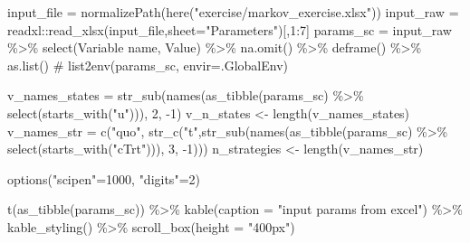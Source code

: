 \documentclass[
  letterpaper,
  DIV=11,
  numbers=noendperiod,
  oneside]{scrartcl}
\newenvironment{Shaded}{\begin{snugshade}}{\end{snugshade}}
\newcommand{\AttributeTok}[1]{\textcolor[rgb]{0.40,0.45,0.13}{#1}}
\newcommand{\CommentTok}[1]{\textcolor[rgb]{0.37,0.37,0.37}{#1}}
\newcommand{\DecValTok}[1]{\textcolor[rgb]{0.68,0.00,0.00}{#1}}
\newcommand{\FunctionTok}[1]{\textcolor[rgb]{0.28,0.35,0.67}{#1}}
\newcommand{\NormalTok}[1]{\textcolor[rgb]{0.00,0.23,0.31}{#1}}
\newcommand{\OtherTok}[1]{\textcolor[rgb]{0.00,0.23,0.31}{#1}}
\newcommand{\SpecialCharTok}[1]{\textcolor[rgb]{0.37,0.37,0.37}{#1}}
\newcommand{\StringTok}[1]{\textcolor[rgb]{0.13,0.47,0.30}{#1}}
\begin{document}
\begin{Shaded}
\begin{Highlighting}[]
\NormalTok{input\_file }\OtherTok{=} \FunctionTok{normalizePath}\NormalTok{(}\FunctionTok{here}\NormalTok{(}\StringTok{"exercise/markov\_exercise.xlsx"}\NormalTok{))}
\NormalTok{input\_raw }\OtherTok{=}\NormalTok{ readxl}\SpecialCharTok{::}\FunctionTok{read\_xlsx}\NormalTok{(input\_file,}\AttributeTok{sheet=}\StringTok{"Parameters"}\NormalTok{)[,}\DecValTok{1}\SpecialCharTok{:}\DecValTok{7}\NormalTok{]}
\NormalTok{params\_sc }\OtherTok{=}\NormalTok{ input\_raw }\SpecialCharTok{\%\textgreater{}\%} 
  \FunctionTok{select}\NormalTok{(}\StringTok{\textasciigrave{}}\AttributeTok{Variable name}\StringTok{\textasciigrave{}}\NormalTok{, Value) }\SpecialCharTok{\%\textgreater{}\%}
  \FunctionTok{na.omit}\NormalTok{() }\SpecialCharTok{\%\textgreater{}\%}
  \FunctionTok{deframe}\NormalTok{() }\SpecialCharTok{\%\textgreater{}\%}
  \FunctionTok{as.list}\NormalTok{()}
\CommentTok{\# list2env(params\_sc, envir=.GlobalEnv)}

\NormalTok{v\_names\_states }\OtherTok{=} \FunctionTok{str\_sub}\NormalTok{(}\FunctionTok{names}\NormalTok{(}\FunctionTok{as\_tibble}\NormalTok{(params\_sc) }\SpecialCharTok{\%\textgreater{}\%} \FunctionTok{select}\NormalTok{(}\FunctionTok{starts\_with}\NormalTok{(}\StringTok{"u"}\NormalTok{))), }\DecValTok{2}\NormalTok{, }\SpecialCharTok{{-}}\DecValTok{1}\NormalTok{)}
\NormalTok{v\_n\_states }\OtherTok{\textless{}{-}} \FunctionTok{length}\NormalTok{(v\_names\_states)}
\NormalTok{v\_names\_str }\OtherTok{=} \FunctionTok{c}\NormalTok{(}\StringTok{"quo"}\NormalTok{, }\FunctionTok{str\_c}\NormalTok{(}\StringTok{"t"}\NormalTok{,}\FunctionTok{str\_sub}\NormalTok{(}\FunctionTok{names}\NormalTok{(}\FunctionTok{as\_tibble}\NormalTok{(params\_sc) }\SpecialCharTok{\%\textgreater{}\%} \FunctionTok{select}\NormalTok{(}\FunctionTok{starts\_with}\NormalTok{(}\StringTok{"cTrt"}\NormalTok{))), }\DecValTok{3}\NormalTok{, }\SpecialCharTok{{-}}\DecValTok{1}\NormalTok{)))}
\NormalTok{n\_strategies }\OtherTok{\textless{}{-}} \FunctionTok{length}\NormalTok{(v\_names\_str)}

\FunctionTok{options}\NormalTok{(}\StringTok{"scipen"}\OtherTok{=}\DecValTok{1000}\NormalTok{, }\StringTok{"digits"}\OtherTok{=}\DecValTok{2}\NormalTok{)}

\FunctionTok{t}\NormalTok{(}\FunctionTok{as\_tibble}\NormalTok{(params\_sc)) }\SpecialCharTok{\%\textgreater{}\%}
  \FunctionTok{kable}\NormalTok{(}\AttributeTok{caption =} \StringTok{"input params from excel"}\NormalTok{) }\SpecialCharTok{\%\textgreater{}\%}
  \FunctionTok{kable\_styling}\NormalTok{() }\SpecialCharTok{\%\textgreater{}\%}
  \FunctionTok{scroll\_box}\NormalTok{(}\AttributeTok{height =} \StringTok{"400px"}\NormalTok{)}
\end{Highlighting}
\end{Shaded}
\end{document}
